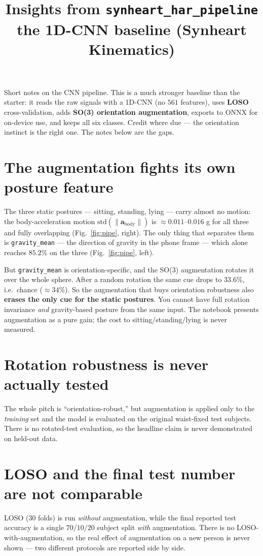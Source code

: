 \documentclass[11pt]{article}
\title{Insights from \texttt{synheart\_har\_pipeline}\\[2pt]
\large the 1D-CNN baseline (Synheart Kinematics)}
\date{}
\begin{document}
\maketitle

Short notes on the CNN pipeline. This is a much stronger baseline than the
starter: it reads the raw signals with a 1D-CNN (no $561$ features), uses
\textbf{LOSO} cross-validation, adds \textbf{SO(3) orientation augmentation},
exports to ONNX for on-device use, and keeps all six classes. Credit where due ---
the orientation instinct is the right one. The notes below are the gaps.

\section{The augmentation fights its own posture feature}
The three static postures --- sitting, standing, lying --- carry almost no motion:
the body-acceleration motion $\mathrm{std}(\lVert \mathbf{a}_{\text{body}}\rVert)$
is $\approx 0.011\text{--}0.016$ g for all three and fully overlapping
(Fig.~\ref{fig:pipe}, right). The only thing that separates them is
\texttt{gravity\_mean} --- the direction of gravity in the phone frame --- which
alone reaches $85.2\%$ on the three (Fig.~\ref{fig:pipe}, left).

But \texttt{gravity\_mean} is orientation-specific, and the SO(3) augmentation
rotates it over the whole sphere. After a random rotation the same cue drops to
$33.6\%$, i.e.\ chance ($\approx 34\%$). So the augmentation that buys orientation
robustness also \textbf{erases the only cue for the static postures}. You cannot
have full rotation invariance \emph{and} gravity-based posture from the same
input. The notebook presents augmentation as a pure gain; the cost to
sitting/standing/lying is never measured.

\section{Rotation robustness is never actually tested}
The whole pitch is ``orientation-robust,'' but augmentation is applied only to the
\emph{training} set and the model is evaluated on the original waist-fixed test
subjects. There is no rotated-test evaluation, so the headline claim is never
demonstrated on held-out data.

\section{LOSO and the final test number are not comparable}
LOSO ($30$ folds) is run \emph{without} augmentation, while the final reported test
accuracy is a single $70/10/20$ subject split \emph{with} augmentation. There is no
LOSO-with-augmentation, so the real effect of augmentation on a new person is never
shown --- two different protocols are reported side by side.
\end{document}
